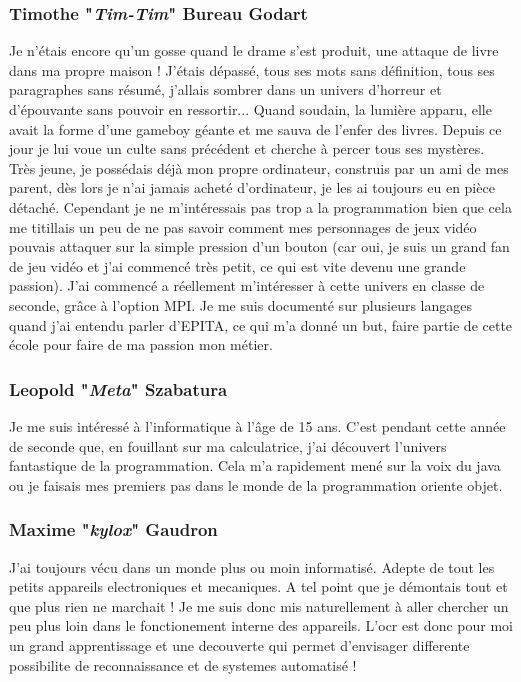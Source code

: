 \documentclass[12pt]{article}
\begin{document}
\subsubsection{Timothe "\textit{Tim-Tim}" Bureau Godart}
Je n'étais encore qu'un gosse quand le drame s'est produit, une attaque de livre dans ma propre maison ! J'étais dépassé, tous ses mots sans définition, tous ses paragraphes sans résumé, j'allais sombrer dans un univers d'horreur et d'épouvante sans pouvoir en ressortir... Quand soudain, la lumière apparu, elle avait la forme d'une gameboy géante et me sauva de l'enfer des livres. Depuis ce jour je lui voue un culte sans précédent et cherche à percer tous ses mystères.
Très jeune, je possédais déjà mon propre ordinateur, construis par un ami de mes parent, dès lors je n'ai jamais acheté d'ordinateur, je les ai toujours eu en pièce détaché. Cependant je ne m'intéressais pas trop a la programmation bien que cela me titillais un peu de ne pas savoir comment mes personnages de jeux vidéo pouvais attaquer sur la simple pression d'un bouton (car oui, je suis un grand fan de jeu vidéo et j'ai commencé très petit, ce qui est vite devenu une grande passion). J'ai commencé a réellement m'intéresser à cette univers en classe de seconde, grâce à l'option MPI. Je me suis documenté sur plusieurs langages quand j'ai entendu parler d'EPITA, ce qui m'a donné un but, faire partie de cette école pour faire de ma passion mon métier.
\subsubsection{Leopold "\textit{Meta}" Szabatura}
Je me suis intéressé à l'informatique à l’âge de 15 ans.
C'est pendant cette année de seconde que, en fouillant sur ma calculatrice, j'ai découvert l'univers fantastique de la programmation.
Cela m'a rapidement mené sur la voix du java ou je faisais mes premiers pas dans le monde de la programmation oriente objet.
\subsubsection{Maxime "\textit{kylox}" Gaudron}
J'ai toujours vécu dans un monde plus ou moin informatisé. Adepte de tout les petits appareils electroniques et mecaniques. A tel point que je démontais tout et que plus rien ne marchait ! Je me suis donc mis naturellement à aller chercher un peu plus loin dans le fonctionement interne des appareils. L'ocr est donc pour moi un grand apprentissage et une decouverte qui permet d'envisager differente possibilite de reconnaissance et de systemes automatisé !
\end{document}
